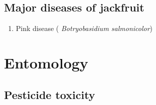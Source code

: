 \documentclass[
  openany]{book}
\providecommand{\tightlist}{%
  \setlength{\itemsep}{0pt}\setlength{\parskip}{0pt}}
\begin{document}
\hypertarget{major-diseases-of-jackfruit}{%
\section{Major diseases of jackfruit}\label{major-diseases-of-jackfruit}}

\begin{enumerate}
\def\labelenumi{\arabic{enumi}.}
\tightlist
\item
  Pink disease ( \emph{Botryobasidium salmonicolor})
\end{enumerate}

\hypertarget{entomology}{%
\chapter{Entomology}\label{entomology}}

\hypertarget{pesticide-toxicity}{%
\section{Pesticide toxicity}\label{pesticide-toxicity}}
\end{document}
